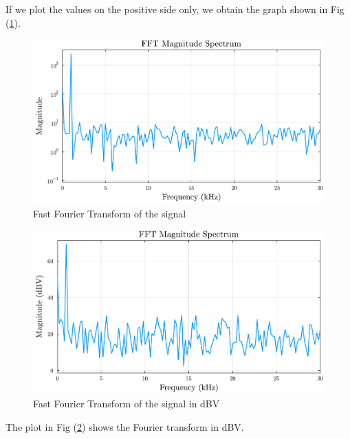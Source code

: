 \documentclass[a4paper,12pt]{article}
\begin{document}
\par If we plot the values on the positive side only, we obtain the graph shown in 
Fig (\ref{plot:Fourier_signal}).
\begin{figure}[H]
    \centering
    \includegraphics[width=1\textwidth]{fft01.pdf}
    \caption{Fast Fourier Transform of the signal}
    \label{plot:Fourier_signal}
\end{figure}
\begin{figure}[H]
    \centering
    \includegraphics[width=1\textwidth]{fft01_dBV.pdf}
    \caption{Fast Fourier Transform of the signal in dBV}
    \label{plot:Fourier_signal_dBV}
\end{figure}

\par The plot in Fig (\ref{plot:Fourier_signal_dBV}) shows the Fourier transform in dBV.
\end{document}
